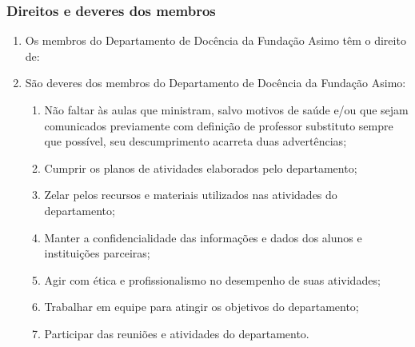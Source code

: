        \subsubsection{Direitos e deveres dos membros}
        \begin{enumerate}
            \item Os membros do Departamento de Docência da Fundação Asimo têm o direito de:
            \item São deveres dos membros do Departamento de Docência da Fundação Asimo:
            \begin{enumerate}
                \item Não faltar às aulas que ministram, salvo motivos de saúde e/ou que sejam comunicados previamente com definição de professor substituto sempre que possível, seu descumprimento acarreta duas advertências; \label{adv2}
                \item Cumprir os planos de atividades elaborados pelo departamento;
                \item Zelar pelos recursos e materiais utilizados nas atividades do departamento;
                \item Manter a confidencialidade das informações e dados dos alunos e instituições parceiras;
                \item Agir com ética e profissionalismo no desempenho de suas atividades;
                \item Trabalhar em equipe para atingir os objetivos do departamento;
                \item Participar das reuniões e atividades do departamento.
            \end{enumerate}
        \end{enumerate}
